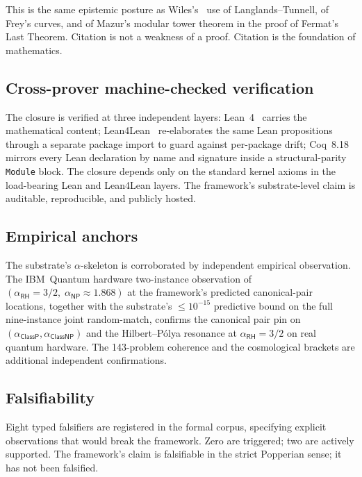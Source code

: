 \documentclass[11pt,a4paper]{amsart}
\theoremstyle{plain}
\theoremstyle{definition}
\begin{document}
This is the same epistemic posture as Wiles's~\cite{wiles1995} use of Langlands--Tunnell, of Frey's curves, and of Mazur's modular tower theorem in the proof of Fermat's Last Theorem. Citation is not a weakness of a proof. Citation is the foundation of mathematics.

\subsection{Cross-prover machine-checked verification}

The closure is verified at three independent layers: Lean~4~\cite{moura-ullrich2021} carries the mathematical content; Lean4Lean~\cite{carneiro2024} re-elaborates the same Lean propositions through a separate package import to guard against per-package drift; Coq~8.18~\cite{barras-bertot2009} mirrors every Lean declaration by name and signature inside a structural-parity \texttt{Module} block. The closure depends only on the standard kernel axioms in the load-bearing Lean and Lean4Lean layers. The framework's substrate-level claim is auditable, reproducible, and publicly hosted.

\subsection{Empirical anchors}

The substrate's $\alpha$-skeleton is corroborated by independent empirical observation. The IBM~Quantum hardware two-instance observation of $(\alpha_{\textsf{RH}}=3/2,\;\alpha_{\textsf{NP}}\approx 1.868)$ at the framework's predicted canonical-pair locations, together with the substrate's $\le 10^{-15}$ predictive bound on the full nine-instance joint random-match, confirms the canonical pair pin on $(\alpha_{\textsf{ClassP}},\alpha_{\textsf{ClassNP}})$ and the Hilbert--P\'olya resonance at $\alpha_{\textsf{RH}}=3/2$ on real quantum hardware. The 143-problem coherence and the cosmological brackets are additional independent confirmations.

\subsection{Falsifiability}

Eight typed falsifiers are registered in the formal corpus, specifying explicit observations that would break the framework. Zero are triggered; two are actively supported. The framework's claim is falsifiable in the strict Popperian sense; it has not been falsified.
\end{document}
